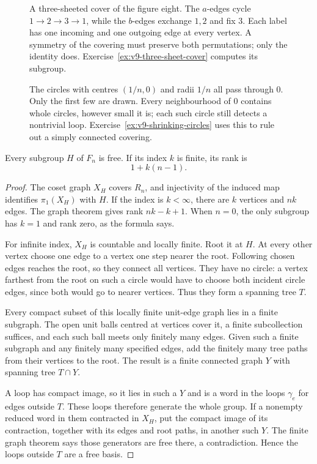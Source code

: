 \begin{figure}[ht]
\centering
{}
\caption{A three-sheeted cover of the figure eight. The $a$-edges cycle $1\to2\to3\to1$, while the $b$-edges exchange $1,2$ and fix $3$. Each label has one incoming and one outgoing edge at every vertex. A symmetry of the covering must preserve both permutations; only the identity does. Exercise~\ref{ex:v9-three-sheet-cover} computes its subgroup.}
\label{fig:v9-three-sheet-cover}
\end{figure}

\begin{figure}[ht]
\centering
{}
\caption{The circles with centres $(1/n,0)$ and radii $1/n$ all pass through $0$. Only the first few are drawn. Every neighbourhood of $0$ contains whole circles, however small it is; each such circle still detects a nontrivial loop. Exercise~\ref{ex:v9-shrinking-circles} uses this to rule out a simply connected covering.}
\label{fig:v9-shrinking-circles}
\end{figure}

\begin{theorem}\label{thm:nielsenschreier}
Every subgroup $H$ of $F_n$ is free. If its index $k$ is finite, its rank is
\[
1+k(n-1).
\]
\end{theorem}

\begin{proof}
The coset graph $X_H$ covers $R_n$, and injectivity of the induced map identifies $\pi_1(X_H)$ with $H$. If the index is $k<\infty$, there are $k$ vertices and $nk$ edges. The graph theorem gives rank $nk-k+1$. When $n=0$, the only subgroup has $k=1$ and rank zero, as the formula says.

For infinite index, $X_H$ is countable and locally finite. Root it at $H$. At every other vertex choose one edge to a vertex one step nearer the root. Following chosen edges reaches the root, so they connect all vertices. They have no circle: a vertex farthest from the root on such a circle would have to choose both incident circle edges, since both would go to nearer vertices. Thus they form a spanning tree $T$.

Every compact subset of this locally finite unit-edge graph lies in a finite subgraph. The open unit balls centred at vertices cover it, a finite subcollection suffices, and each such ball meets only finitely many edges. Given such a finite subgraph and any finitely many specified edges, add the finitely many tree paths from their vertices to the root. The result is a finite connected graph $Y$ with spanning tree $T\cap Y$.

A loop has compact image, so it lies in such a $Y$ and is a word in the loops $\gamma_e$ for edges outside $T$. These loops therefore generate the whole group. If a nonempty reduced word in them contracted in $X_H$, put the compact image of its contraction, together with its edges and root paths, in another such $Y$. The finite graph theorem says those generators are free there, a contradiction. Hence the loops outside $T$ are a free basis.
\end{proof}

